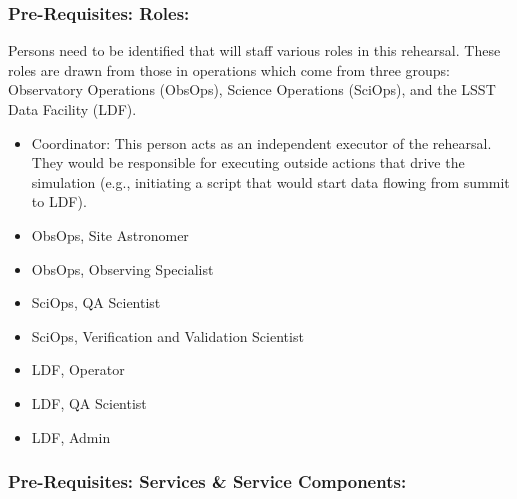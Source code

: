 \subsubsection{Pre-Requisites: Roles:}

Persons need to be identified that will staff various roles in this 
rehearsal.  These roles are drawn from those in operations which come
from three groups: Observatory Operations (ObsOps), Science Operations 
(SciOps), and the LSST Data Facility (LDF).
\begin{itemize}[topsep=-8pt]
\item Coordinator:  This person acts as an independent executor of the 
rehearsal.  They would be responsible for executing outside actions that drive the 
simulation (e.g., initiating a script that would start data flowing from 
summit to LDF).
\item ObsOps, Site Astronomer
\item ObsOps, Observing Specialist
\item SciOps, QA Scientist
\item SciOps, Verification and Validation Scientist
\item LDF, Operator
\item LDF, QA Scientist
\item LDF, Admin
\end{itemize}


\subsubsection{Pre-Requisites: Services \& Service Components:}

